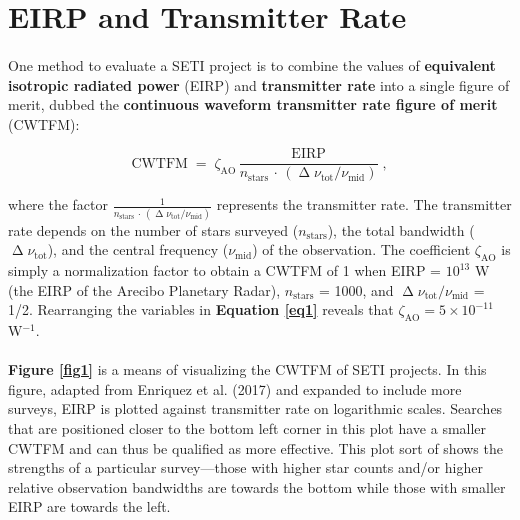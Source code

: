 \documentclass{article}
\begin{document}
\section{EIRP and Transmitter Rate}

\paragraph{}
One method to evaluate a SETI project is to combine the values of \textbf{equivalent isotropic radiated power} (EIRP) and \textbf{transmitter rate} into a single figure of merit, dubbed the \textbf{continuous waveform transmitter rate figure of merit} (CWTFM):

\begin{equation}
\textrm{CWTFM} \; = \; \zeta_{\textrm{AO}} \, \frac{\textrm{EIRP}}{n_{\textrm{stars}} \, \cdot \, (\upDelta \nu_{\textrm{tot}} / \nu_{\textrm{mid}})} \; ,
\label{eq1}
\end{equation}

where the factor $\frac{1}{n_{\textrm{stars}} \, \cdot \, (\upDelta \nu_{\textrm{tot}} / \nu_{\textrm{mid}})}$ represents the transmitter rate. The transmitter rate depends on the number of stars surveyed ($n_{\textrm{stars}}$), the total bandwidth ($\upDelta \nu_{\textrm{tot}}$), and the central frequency ($\nu_{\textrm{mid}}$) of the observation. The coefficient $\zeta_{\textrm{AO}}$ is simply a normalization factor to obtain a CWTFM of 1 when EIRP = $10^{13}$ W (the EIRP of the Arecibo Planetary Radar),  $n_{\textrm{stars}}$ = 1000, and $\upDelta \nu_{\textrm{tot}} / \nu_{\textrm{mid}}$ = 1/2. Rearranging the variables in \textbf{Equation \ref{eq1}} reveals that $\zeta_{\textrm{AO}} = 5 \times 10^{-11}$ W$^{-1}$.

\paragraph{}
\textbf{Figure \ref{fig1}} is a means of visualizing the CWTFM of SETI projects. In this figure, adapted from Enriquez et al. (2017) and expanded to include more surveys, EIRP is plotted against transmitter rate on logarithmic scales. Searches that are positioned closer to the bottom left corner in this plot have a smaller CWTFM and can thus be qualified as more effective. This plot sort of shows the strengths of a particular survey---those with higher star counts and/or higher relative observation bandwidths are towards the bottom while those with smaller EIRP are towards the left.
\end{document}
